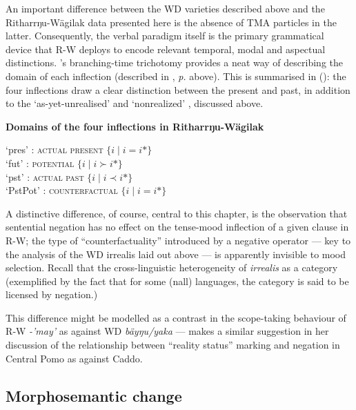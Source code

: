 \xe

An important difference between the WD varieties described above and the Ritharrŋu-Wägilak data presented here is the absence of TMA particles in the latter. Consequently, the verbal paradigm itself is the primary grammatical device that R-W deploys to encode relevant temporal, modal and aspectual distinctions. 's branching-time trichotomy provides a neat way of describing the domain of each inflection (described in , \textit{p.} above). This is summarised in (\nextx): the four inflections draw a clear distinction between the present and past, in addition to the `as-yet-unrealised' and `nonrealized' \citep[cf.][]{Cristofaro2012}, discussed above.

\pex \textbf{Domains of the four inflections in Ritharrŋu-Wägilak}


\denote[i*]{\I} `\gls{pres}' : \textsc{actual present} $ \{i\mid i = i*\} $\\
\denote[i*]{\II} `\gls{fut}' : \textsc{potential} $ \{i\mid i \succ i*\} $\\
\denote[i*]{\III} `\gls{pst}' : \textsc{actual past} $ \{i\mid i \prec i*\} $\\
\denote[i*]{\V} `\gls{PstPot}' : \textsc{counterfactual} $ \{i\mid i = i*\} $
\xe

A distinctive difference, of course, central to this chapter, is the observation that sentential negation has no effect on the tense-mood inflection of a given clause in R-W; the type of ``counterfactuality'' introduced by a negative operator --- key to the analysis of the WD irrealis laid out above --- is apparently invisible to mood selection. 
Recall that the cross-linguistic heterogeneity of \textit{irrealis} as a category (exemplified by the fact that for some (nall) languages, the category is said to be licensed by negation.) 

This difference might be modelled as a contrast in the scope-taking behaviour of R‑W \textit{-'may'} as against WD \textit{bäyŋu/yaka} --- \citet[]{Mithun1995} makes a similar suggestion in her discussion of the relationship between ``reality status'' marking and negation in Central Pomo as against Caddo.


\subsection{Morphosemantic change}

